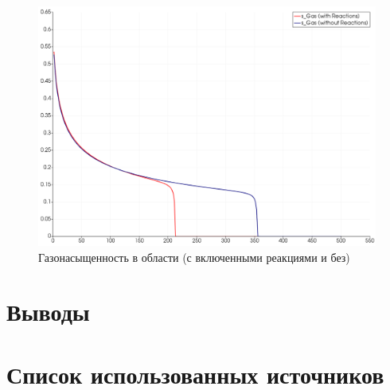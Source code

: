 \documentclass[14pt,a4paper]{extarticle}
\begin{document}
\begin{figure}[h!]
\centering
\includegraphics[width=.8\textwidth]{sG}
\caption{Газонасыщенность в области (с включенными реакциями и без)} \label{fig:pic2}
\end{figure}

\clearpage
\section{Выводы}

\clearpage
\section*{Список использованных источников}
\end{document}
